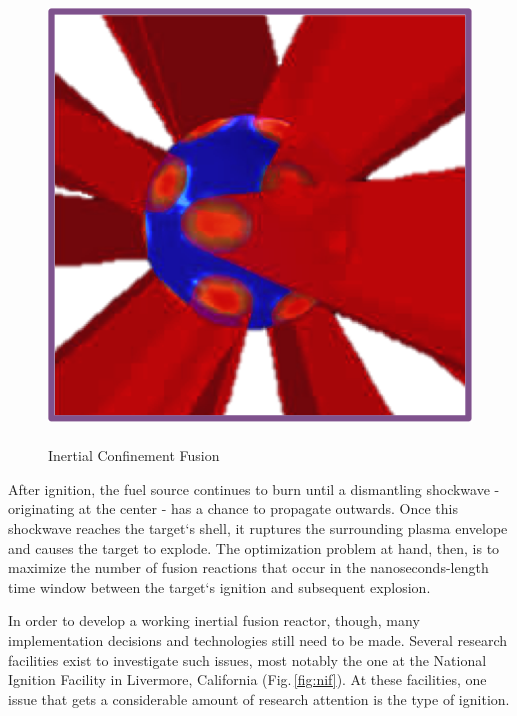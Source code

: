 \begin{figure}	
	\centering
	\includegraphics[scale=.95]{graphics/laserFusion.png}
	\caption[Inertial Confinement Fusion]{ \\ Inertial Confinement Fusion \\  }
	\label{fig:laser}
\end{figure}

After ignition, the fuel source continues to burn until a dismantling shockwave - originating at the center - has a chance to propagate outwards.  Once this shockwave reaches the target`s shell, it ruptures the surrounding plasma envelope and causes the target to explode.  The optimization problem at hand, then, is to maximize the number of fusion reactions that occur in the nanoseconds-length time window between the target`s ignition and subsequent explosion.

In order to develop a working inertial fusion reactor, though, many implementation decisions and technologies still need to be made.  Several research facilities exist to investigate such issues, most notably the one at the National Ignition Facility in Livermore, California (Fig.\,\ref{fig:nif}).  At these facilities, one issue that gets a considerable amount of research attention is the type of ignition.  

